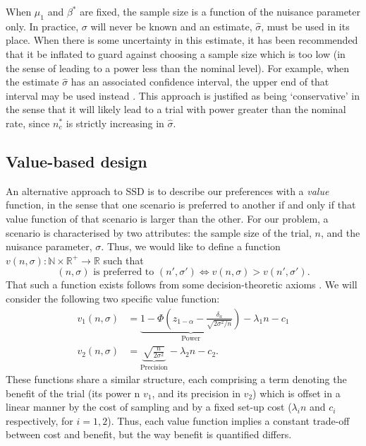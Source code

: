 \documentclass[sagev, Crown]{sagej}
\begin{document}
When $\mu_1$ and $\beta^*$ are fixed, the sample size is a function of the nuisance parameter only. In practice, $\sigma$ will never be known and an estimate, $\hat{\sigma}$, must be used in its place. When there is some uncertainty in this estimate, it has been recommended that it be inflated to guard against choosing a sample size which is too low (in the sense of leading to a power less than the nominal level). For example, when the estimate $\hat{\sigma}$ has an associated confidence interval, the upper end of that interval may be used instead \cite{Browne1995, Teare2014}. This approach is justified as being `conservative' in the sense that it will likely lead to a trial with power greater than the nominal rate, since $n^*_c$ is strictly increasing in $\hat{\sigma}$. 

\subsection{Value-based design}

An alternative approach to SSD is to describe our preferences with a \emph{value} function, in the sense that one scenario is preferred to another if and only if that value function of that scenario is larger than the other. For our problem, a scenario is characterised by two attributes: the sample size of the trial, $n$, and the nuisance parameter, $\sigma$. Thus, we would like to define a function $v(n, \sigma): \mathbb{N} \times \mathbb{R}^+ \rightarrow \mathbb{R}$ such that
$$
(n, \sigma) \text{ is preferred to }(n', \sigma') \Leftrightarrow v(n, \sigma) > v(n', \sigma').
$$
That such a function exists follows from some decision-theoretic axioms \cite{French2000}. We will consider the following two specific value function:
$$
\begin{aligned}
v_1(n, \sigma) & = \underbrace{1 - \Phi\left(z_{1 - \alpha} - \frac{\delta_a}{\sqrt{2\sigma^2/n}}\right)}_\textrm{Power} - \lambda_1 n - c_1 \\
v_2(n, \sigma) & = \underbrace{\sqrt{\frac{n}{2\sigma^2}}}_\textrm{Precision} - \lambda_2 n - c_2.
\end{aligned}
$$
These functions share a similar structure, each comprising a term denoting the benefit of the trial (its power n $v_1$, and its precision in $v_2$) which is offset in a linear manner by the cost of sampling and by a fixed set-up cost ($\lambda_i n$ and $c_i$ respectively, for $i = 1, 2$). Thus, each value function implies a constant trade-off between cost and benefit, but the way benefit is quantified differs.
\end{document}
